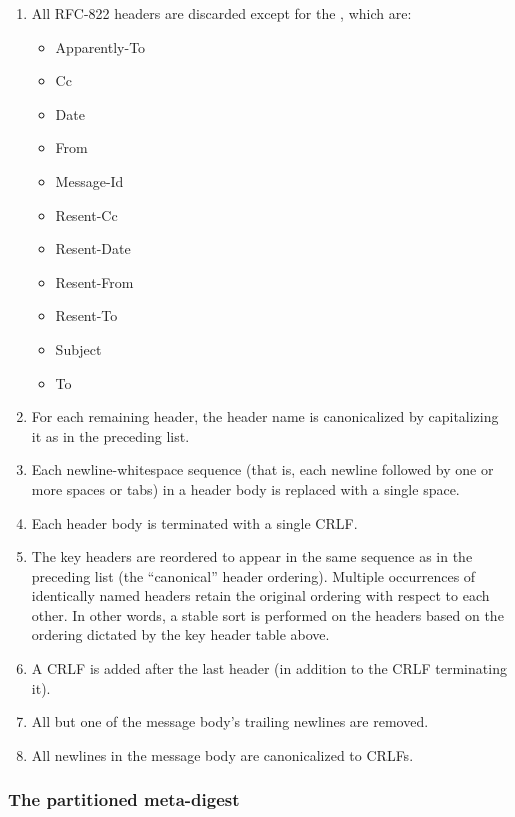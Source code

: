 \begin{enumerate}
\item
All RFC-822 headers are discarded except for the ,
which are:
\begin{itemize}
\item Apparently-To
\item Cc
\item Date
\item From
\item Message-Id
\item Resent-Cc
\item Resent-Date
\item Resent-From
\item Resent-To
\item Subject
\item To
\end{itemize}

\item
For each remaining header, the header name is canonicalized by
capitalizing it as in the preceding list.

\item
Each newline-whitespace sequence (that is, each newline followed by
one or more spaces or tabs) in a header body is replaced with a single
space.

\item
Each header body is terminated with a single CRLF.

\item
The key headers are reordered to appear in the same sequence as in the
preceding list (the ``canonical'' header ordering).  Multiple
occurrences of identically named headers retain the original ordering
with respect to each other.  In other words, a stable sort is
performed on the headers based on the ordering dictated by the key
header table above.

\item
A CRLF is added after the last header (in addition to the CRLF
terminating it).

\item
All but one of the message body's trailing newlines are removed.

\item
All newlines in the message body are canonicalized to CRLFs.
\end{enumerate}

\subsubsection{The partitioned meta-digest}

